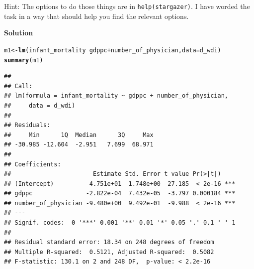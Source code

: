 \documentclass{article}\usepackage[]{graphicx}\usepackage[]{color}
\makeatletter
\newcommand{\hlopt}[1]{\textcolor[rgb]{0,0,0}{#1}}%
\newcommand{\hlstd}[1]{\textcolor[rgb]{0.345,0.345,0.345}{#1}}%
\newcommand{\hlkwb}[1]{\textcolor[rgb]{0.69,0.353,0.396}{#1}}%
\newcommand{\hlkwc}[1]{\textcolor[rgb]{0.333,0.667,0.333}{#1}}%
\newcommand{\hlkwd}[1]{\textcolor[rgb]{0.737,0.353,0.396}{\textbf{#1}}}%
\newenvironment{kframe}{%
 \def\at@end@of@kframe{}%
 \ifinner\ifhmode%
  \def\at@end@of@kframe{\end{minipage}}%
  \begin{minipage}{\columnwidth}%
 \fi\fi%
 \def\FrameCommand##1{\hskip\@totalleftmargin \hskip-\fboxsep
 \colorbox{shadecolor}{##1}\hskip-\fboxsep
     \hskip-\linewidth \hskip-\@totalleftmargin \hskip\columnwidth}%
 \MakeFramed {\advance\hsize-\width
   \@totalleftmargin\z@ \linewidth\hsize
   \@setminipage}}%
 {\par\unskip\endMakeFramed%
 \at@end@of@kframe}
\newenvironment{knitrout}{}{} %
\makeatother
\begin{document}
Hint: The options to do those things are in \verb`help(stargazer)`. I have worded the task in a way that should help you find the relevant options.

\textbf{Solution}

\begin{knitrout}
\color{fgcolor}\begin{kframe}
\begin{alltt}
\hlstd{m1} \hlkwb{<-} \hlkwd{lm}\hlstd{(infant_mortality} \hlopt{~} \hlstd{gdppc} \hlopt{+} \hlstd{number_of_physician,} \hlkwc{data} \hlstd{= d_wdi)}
\hlkwd{summary}\hlstd{(m1)}
\end{alltt}
\begin{verbatim}
## 
## Call:
## lm(formula = infant_mortality ~ gdppc + number_of_physician, 
##     data = d_wdi)
## 
## Residuals:
##     Min      1Q  Median      3Q     Max 
## -30.985 -12.604  -2.951   7.699  68.971 
## 
## Coefficients:
##                       Estimate Std. Error t value Pr(>|t|)    
## (Intercept)          4.751e+01  1.748e+00  27.185  < 2e-16 ***
## gdppc               -2.822e-04  7.432e-05  -3.797 0.000184 ***
## number_of_physician -9.480e+00  9.492e-01  -9.988  < 2e-16 ***
## ---
## Signif. codes:  0 '***' 0.001 '**' 0.01 '*' 0.05 '.' 0.1 ' ' 1
## 
## Residual standard error: 18.34 on 248 degrees of freedom
## Multiple R-squared:  0.5121,	Adjusted R-squared:  0.5082 
## F-statistic: 130.1 on 2 and 248 DF,  p-value: < 2.2e-16
\end{verbatim}
\end{kframe}
\end{knitrout}
\end{document}
